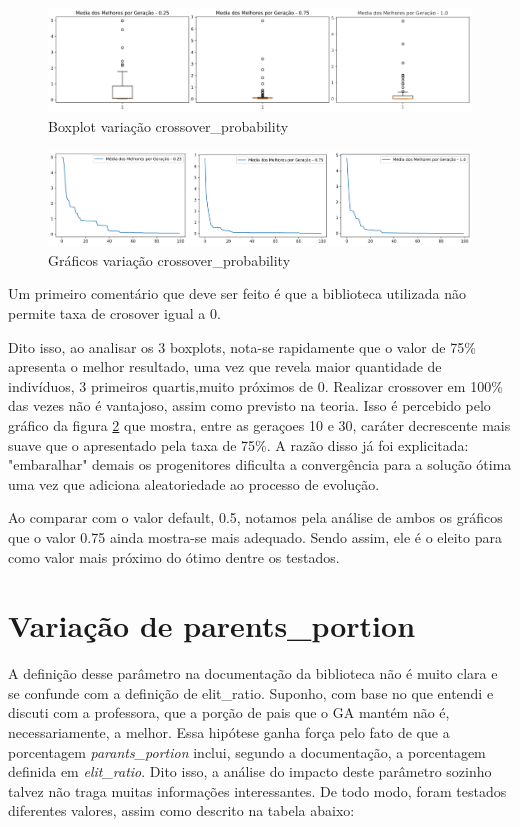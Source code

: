 \documentclass[12pt]{article}
\begin{document}
\begin{figure}[H]
	\centering
	\includegraphics[width=0.9\linewidth]{Imagens/crossover/boxplotTaxaCross}
	\caption{Boxplot variação crossover\_probability}
	\label{fig:boxplottaxacross}
\end{figure}
\begin{figure}[H]
	\centering
	\includegraphics[width=0.9\linewidth]{Imagens/crossover/graficoTaxaCross}
	\caption{Gráficos variação crossover\_probability}
	\label{fig:graficotaxacross}
\end{figure}

Um primeiro comentário que deve ser feito é que a biblioteca utilizada não permite taxa de crosover igual a 0.

Dito isso, ao analisar os 3 boxplots, nota-se rapidamente que o valor de 75\% apresenta o melhor resultado, uma vez que revela maior quantidade de indivíduos, 3 primeiros quartis,muito próximos de 0. Realizar crossover em 100\% das vezes não é vantajoso, assim como previsto na teoria. Isso é percebido pelo gráfico da figura \ref{fig:graficotaxacross} que mostra, entre as geraçoes 10 e 30, caráter decrescente mais suave que o apresentado pela taxa de 75\%. A razão disso já foi explicitada: "embaralhar" demais os progenitores dificulta a convergência para a solução ótima uma vez que adiciona aleatoriedade ao processo de evolução.

Ao comparar com o valor default, 0.5, notamos pela análise de ambos os gráficos que o valor 0.75 ainda mostra-se mais adequado. Sendo assim, ele é o eleito para como valor mais próximo do ótimo dentre os testados. 

\section{Variação de parents\_portion}

A definição desse parâmetro na documentação da biblioteca não é muito clara e se confunde com a definição de elit\_ratio. Suponho, com base no que entendi e discuti com a professora, que a porção de pais que o GA mantém não é, necessariamente, a melhor. Essa hipótese ganha força pelo fato de que a porcentagem \textit{parants\_portion} inclui, segundo a documentação, a porcentagem definida em \textit{elit\_ratio}. Dito isso, a análise do impacto deste parâmetro sozinho talvez não traga muitas informações interessantes. De todo modo, foram testados diferentes valores, assim como descrito na tabela abaixo:
\end{document}
